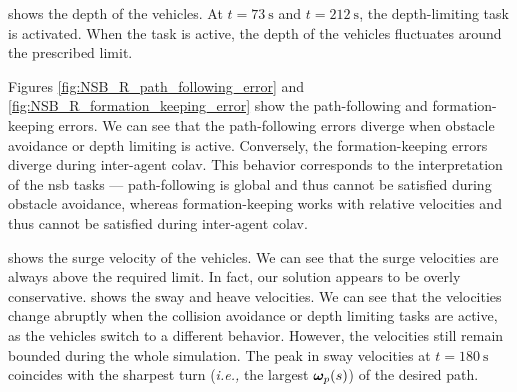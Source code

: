  shows the depth of the vehicles.
At $t = \SI{73}{\second}$ and $t = \SI{212}{\second}$, the depth-limiting task is activated.
When the task is active, the depth of the vehicles fluctuates around the prescribed limit.



Figures \ref{fig:NSB_R_path_following_error} and \ref{fig:NSB_R_formation_keeping_error} show the path-following and formation-keeping errors.
We can see that the path-following errors diverge when obstacle avoidance or depth limiting is active.
Conversely, the formation-keeping errors diverge during inter-agent \gls{colav}.
This behavior corresponds to the interpretation of the \gls{nsb} tasks --- path-following is global and thus cannot be satisfied during obstacle avoidance, whereas formation-keeping works with relative velocities and thus cannot be satisfied during inter-agent \gls{colav}.



 shows the surge velocity of the vehicles.
We can see that the surge velocities are always above the required limit.
In fact, our solution appears to be overly conservative.
 shows the sway and heave velocities.
We can see that the velocities change abruptly when the collision avoidance or depth limiting tasks are active, as the vehicles switch to a different behavior.
However, the velocities still remain bounded during the whole simulation.
The peak in sway velocities at $t = \SI{180}{\second}$ coincides with the sharpest turn (\emph{i.e.,} the largest $\bm{\omega}_p(s)$) of the desired path.
